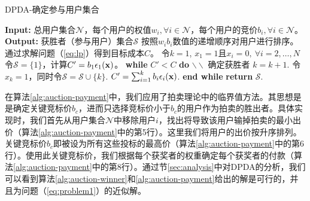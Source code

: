 	\begin{algorithm}
		\caption{DPDA-确定参与用户集合}
		\label{alg:auction-winner}
		\begin{algorithmic}[1]
			\STATE \textbf{Input:} 总用户集合$\mathcal{N}$，每个用户的权值$w_i, \forall i\in\mathcal{N}$，每个用户的竞价$b_i, \forall i\in\mathcal{N}$。
			\STATE \textbf{Output:} 获胜者（参与用户）集合$\mathcal{S}$
			\STATE 按照$w_ib_i$数值的递增顺序对用户进行排序。
			\STATE 通过求解问题（\ref{eq:lp}）得到目标成本$C$。
			\STATE 令$k=1$, $x_1=1$且$x_i=0,~\forall i=2,\dots,N$
			\STATE 令$\mathcal{S}=\{1\}$，计算$C'=b_1\epsilon_1(\mathbf{x})$。
			\STATE \textbf{while} $C'<C$ \textbf{do} $\backslash\backslash$ 确定获胜者
			\STATE \quad $k=k+1$. 
			\STATE \quad 令$x_k=1$，同时令$\mathcal{S}=\mathcal{S}\cup\{k\}$.
			\STATE \quad $C'=\sum_{i=1}^kb_i\epsilon_i(\mathbf{x})$.
			\STATE \textbf{end while}
			\STATE \textbf{return} $\mathcal{S}$.
		\end{algorithmic}
	\end{algorithm}
	
	在算法\ref{alg:auction-payment}中，我们应用了拍卖理论\cite{milgrom2004putting}中的临界值方法。其思想是是确定关键竞标价$b_c$，进而只选择竞标价小于$b_c$的用户作为拍卖的胜出者。具体实现时，我们首先从用户集合$\mathcal{N}$中移除用户$i$，找出将导致该用户输掉拍卖的最小出价（算法\ref{alg:auction-payment}中的第5行）。这里我们将用户的出价按升序排列。关键竞标价$b_c$即被设为所有这些投标的最高价（算​​法\ref{alg:auction-payment}中的第6行）。使用此关键竞标价，我们根据每个获奖者的权重确定每个获奖者的付款（算法\ref{alg:auction-payment}中的第8行）。通过节\ref{sec:analysis}中对DPDA的分析，我们可以看到算法\ref{alg:auction-winner}和\ref{alg:auction-payment}给出的解是可行的，并且为问题（\ref{eq:problem1}）的近似解。


